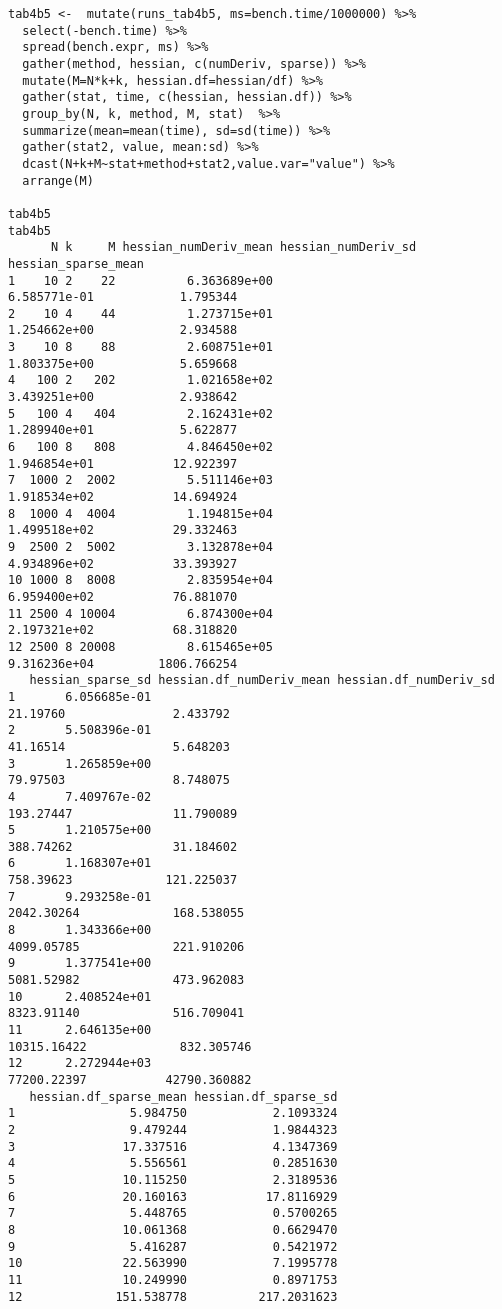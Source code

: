 \documentclass{article}
\newenvironment{revQuote}{\itshape}{\vspace{\baselineskip}}
\begin{document}
\begin{enumerate}
\begin{revQuote}
\begin{verbatim}
tab4b5 <-  mutate(runs_tab4b5, ms=bench.time/1000000) %>%
  select(-bench.time) %>%
  spread(bench.expr, ms) %>%
  gather(method, hessian, c(numDeriv, sparse)) %>%
  mutate(M=N*k+k, hessian.df=hessian/df) %>%
  gather(stat, time, c(hessian, hessian.df)) %>%
  group_by(N, k, method, M, stat)  %>%
  summarize(mean=mean(time), sd=sd(time)) %>%
  gather(stat2, value, mean:sd) %>%
  dcast(N+k+M~stat+method+stat2,value.var="value") %>%
  arrange(M)

tab4b5
tab4b5
      N k     M hessian_numDeriv_mean hessian_numDeriv_sd
hessian_sparse_mean
1    10 2    22          6.363689e+00       
6.585771e-01            1.795344
2    10 4    44          1.273715e+01       
1.254662e+00            2.934588
3    10 8    88          2.608751e+01       
1.803375e+00            5.659668
4   100 2   202          1.021658e+02       
3.439251e+00            2.938642
5   100 4   404          2.162431e+02       
1.289940e+01            5.622877
6   100 8   808          4.846450e+02       
1.946854e+01           12.922397
7  1000 2  2002          5.511146e+03       
1.918534e+02           14.694924
8  1000 4  4004          1.194815e+04       
1.499518e+02           29.332463
9  2500 2  5002          3.132878e+04       
4.934896e+02           33.393927
10 1000 8  8008          2.835954e+04       
6.959400e+02           76.881070
11 2500 4 10004          6.874300e+04       
2.197321e+02           68.318820
12 2500 8 20008          8.615465e+05       
9.316236e+04         1806.766254
   hessian_sparse_sd hessian.df_numDeriv_mean hessian.df_numDeriv_sd
1       6.056685e-01                
21.19760               2.433792
2       5.508396e-01                
41.16514               5.648203
3       1.265859e+00                
79.97503               8.748075
4       7.409767e-02               
193.27447              11.790089
5       1.210575e+00               
388.74262              31.184602
6       1.168307e+01               
758.39623             121.225037
7       9.293258e-01              
2042.30264             168.538055
8       1.343366e+00              
4099.05785             221.910206
9       1.377541e+00              
5081.52982             473.962083
10      2.408524e+01              
8323.91140             516.709041
11      2.646135e+00             
10315.16422             832.305746
12      2.272944e+03             
77200.22397           42790.360882
   hessian.df_sparse_mean hessian.df_sparse_sd
1                5.984750            2.1093324
2                9.479244            1.9844323
3               17.337516            4.1347369
4                5.556561            0.2851630
5               10.115250            2.3189536
6               20.160163           17.8116929
7                5.448765            0.5700265
8               10.061368            0.6629470
9                5.416287            0.5421972
10              22.563990            7.1995778
11              10.249990            0.8971753
12             151.538778          217.2031623



\end{verbatim}
\end{revQuote}
\end{enumerate}
\end{document}
